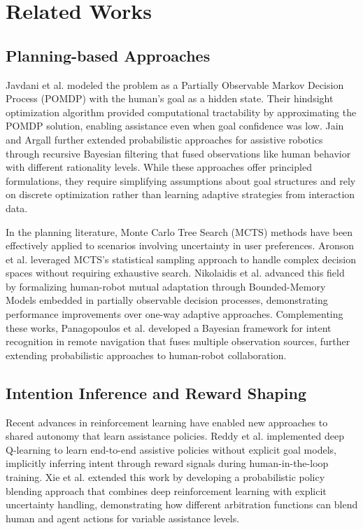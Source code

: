 \documentclass[11pt]{article}
\begin{document}
 

\section{Related Works}

\subsection{Planning-based Approaches}

Javdani et al. \cite{javdani} modeled the problem as a Partially Observable Markov Decision Process (POMDP) with the human's goal as a hidden state. Their hindsight optimization algorithm provided computational tractability by approximating the POMDP solution, enabling assistance even when goal confidence was low. Jain and Argall \cite{jain2019} further extended probabilistic approaches for assistive robotics through recursive Bayesian filtering that fused observations like human behavior with different rationality levels. While these approaches offer principled formulations, they require simplifying assumptions about goal structures and rely on discrete optimization rather than learning adaptive strategies from interaction data.


In the planning literature, Monte Carlo Tree Search (MCTS) methods have been effectively applied to scenarios involving uncertainty in user preferences. Aronson et al. \cite{aronson} leveraged MCTS's statistical sampling approach to handle complex decision spaces without requiring exhaustive search. Nikolaidis et al. \cite{nikolaidis} advanced this field by formalizing human-robot mutual adaptation through Bounded-Memory Models embedded in partially observable decision processes, demonstrating performance improvements over one-way adaptive approaches. Complementing these works, Panagopoulos et al. \cite{panagopoulos2021} developed a Bayesian framework for intent recognition in remote navigation that fuses multiple observation sources, further extending probabilistic approaches to human-robot collaboration.


\subsection{Intention Inference and Reward Shaping}

Recent advances in reinforcement learning have enabled new approaches to shared autonomy that learn assistance policies. Reddy et al. \cite{DQN} implemented deep Q-learning to learn end-to-end assistive policies without explicit goal models, implicitly inferring intent through reward signals during human-in-the-loop training. Xie et al. \cite{xie2022} extended this work by developing a probabilistic policy blending approach that combines deep reinforcement learning with explicit uncertainty handling, demonstrating how different arbitration functions can blend human and agent actions for variable assistance levels.
\end{document}
